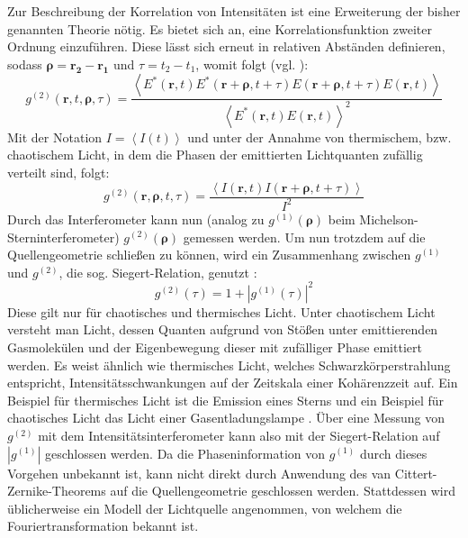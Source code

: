 Zur Beschreibung der Korrelation von Intensitäten ist eine Erweiterung der bisher genannten Theorie nötig. 
Es bietet sich an, eine Korrelationsfunktion zweiter Ordnung einzuführen. 
Diese lässt sich erneut in relativen Abständen definieren, sodass $\bm{\rho} = \mathbf{r_2} - \mathbf{r_1}$ und $\tau = t_2 - t_1$, womit folgt (vgl. \cite{foellmiIntensityInterferometrySecondorder2009}):
\begin{equation}
    g^{(2)}(\mathbf{r}, t, \bm{\rho}, \tau) = \frac{\left<E^*(\mathbf{r}, t)E^*(\mathbf{r}+\bm{\rho}, t+\tau)E(\mathbf{r}+\bm{\rho}, t+\tau)E(\mathbf{r}, t)\right>}
        {\left<E^*(\mathbf{r}, t)E(\mathbf{r}, t)\right>^2}
\end{equation}
Mit der Notation $I=\left<I(t)\right>$ und unter der Annahme von thermischem, bzw. chaotischem Licht, in dem die Phasen der emittierten Lichtquanten zufällig verteilt sind, folgt:
\begin{equation}
    g^{(2)}(\mathbf{r}, \bm{\rho}, t, \tau) =  \frac{\left<I(\mathbf{r}, t) I(\mathbf{r}+\bm{\rho}, t+\tau)\right>}{I^2}
    \label{eq:g2_final}
\end{equation}
Durch das Interferometer kann nun (analog zu $g^{(1)}(\bm{\rho})$ beim Michelson-Sterninterferometer) $g^{(2)}(\bm{\rho})$ gemessen werden. 
Um nun trotzdem auf die Quellengeometrie schließen zu können, wird ein Zusammenhang zwischen $g^{(1)}$ und $g^{(2)}$, die sog. Siegert-Relation, genutzt \cite{lasseguesFieldIntensityCorrelations2022}:
\begin{equation}
    g^{(2)}(\tau) = 1+ \left|g^{(1)}(\tau)\right|^2
\end{equation}
Diese gilt nur für chaotisches und thermisches Licht. 
Unter chaotischem Licht versteht man Licht, dessen Quanten aufgrund von Stößen unter emittierenden Gasmolekülen und der Eigenbewegung dieser mit zufälliger Phase emittiert werden. 
Es weist ähnlich wie thermisches Licht, welches Schwarzkörperstrahlung entspricht, Intensitätsschwankungen auf der Zeitskala einer Kohärenzzeit auf. 
Ein Beispiel für thermisches Licht ist die Emission eines Sterns und ein Beispiel für chaotisches Licht das Licht einer Gasentladungslampe \cite{foxQuantumOpticsIntroduction2006}. 
Über eine Messung von $g^{(2)}$ mit dem Intensitätsinterferometer kann also mit der Siegert-Relation auf $\left|g^{(1)}\right|$ geschlossen werden. 
Da die Phaseninformation von $g^{(1)}$ durch dieses Vorgehen unbekannt ist, kann nicht direkt durch Anwendung des van Cittert-Zernike-Theorems auf die Quellengeometrie geschlossen werden. 
Stattdessen wird üblicherweise ein Modell der Lichtquelle angenommen, von welchem die Fouriertransformation bekannt ist. 
